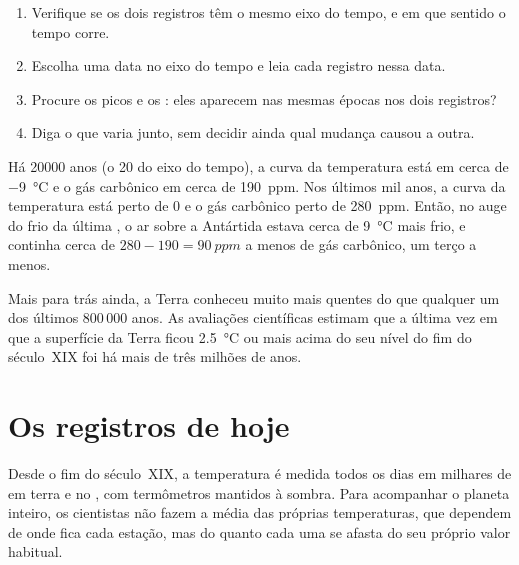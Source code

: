 \begin{method}
\begin{enumerate}
  \item Verifique se os dois registros têm o mesmo eixo do tempo, e em
        que sentido o tempo corre.
  \item Escolha uma data no eixo do tempo e leia cada registro nessa data.
  \item Procure os picos e os : eles aparecem nas mesmas épocas nos
        dois registros?
  \item Diga o que varia junto, sem decidir ainda qual mudança causou
        a outra.
\end{enumerate}
\end{method}

\begin{example}
Há \num{20000} anos (o 20 do eixo do tempo), a curva da temperatura está
em cerca de \qty{-9}{\degreeCelsius} e o gás carbônico em cerca de
\qty{190}{ppm}. Nos últimos mil anos, a curva da temperatura está perto
de 0 e o gás carbônico perto de \qty{280}{ppm}. Então, no auge do frio
da última , o ar sobre a Antártida estava cerca de
\qty{9}{\degreeCelsius} mais frio, e continha cerca de
$280 - 190 = \qty{90}{ppm}$ a menos de gás carbônico, um terço a menos.
\end{example}

Mais para trás ainda, a Terra conheceu  muito mais quentes do que
qualquer um dos últimos 800\,000 anos. As avaliações científicas estimam
que a última vez em que a superfície da Terra ficou
\qty{2.5}{\degreeCelsius} ou mais acima do seu nível do fim do século~XIX
foi há mais de três milhões de anos.

\section{Os registros de hoje}

Desde o fim do século~XIX, a temperatura é medida todos os dias em
milhares de  em terra e no , com termômetros
mantidos à sombra. Para acompanhar o planeta inteiro, os cientistas não
fazem a média das próprias temperaturas, que dependem de onde fica cada
estação, mas do quanto cada uma se afasta do seu próprio valor habitual.

